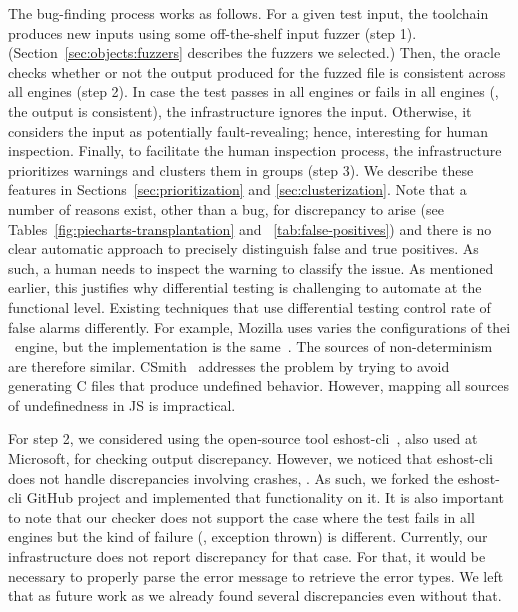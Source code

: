 \documentclass[smallextended]{svjour3}
\begin{document}
The bug-finding process works as follows. For a given test input, the
toolchain produces new inputs using some off-the-shelf input fuzzer
(step 1).  (Section~\ref{sec:objects:fuzzers} describes the fuzzers we
selected.)  Then, the oracle checks whether or not the output produced
for the fuzzed file is consistent across all engines (step 2). In case
the test passes in all engines or fails in all engines (\ie{}, the
output is consistent), the infrastructure ignores the
input. Otherwise, it considers the input as potentially
fault-revealing; hence, interesting for human inspection. Finally, to
facilitate the human inspection process, the infrastructure
prioritizes warnings and clusters them in groups (step 3). We describe
these features in Sections~\ref{sec:prioritization} and
\ref{sec:clusterization}. Note that a number of reasons exist, other
than a bug, for discrepancy to arise (see
Tables~\ref{fig:piecharts-transplantation} and
~\ref{tab:false-positives}) and there is no clear automatic approach
to precisely distinguish false and true positives. As such, a human
needs to inspect the warning to classify the issue. As mentioned
earlier, this justifies why differential testing is challenging to
automate at the functional level. Existing techniques that use
differential testing control rate of false alarms differently. For
example, Mozilla uses varies the configurations of thei
\smonkey\ engine, but the implementation is the
same~\cite{mozilla-severity}. The sources of non-determinism are
therefore similar. CSmith~\cite{Yang:2011:FUB:1993498.1993532}
addresses the problem by trying to avoid generating C files that
produce undefined behavior. However, mapping all sources of
undefinedness in JS is impractical.

For step 2, we considered using the open-source tool
eshost-cli~\cite{eshost-cli}, also used at Microsoft, for checking
output discrepancy. However, we noticed that eshost-cli does not
handle discrepancies involving crashes, . As such, we forked the
eshost-cli GitHub project and implemented that functionality on it. It
is also important to note that our checker does not support the case
where the test fails in all engines but the kind of failure (\eg{},
exception thrown) is different. Currently, our infrastructure does not
report discrepancy for that case. For that, it would be necessary to
properly parse the error message to retrieve the error types. We left
that as future work as we already found several discrepancies even
without that.
\end{document}
